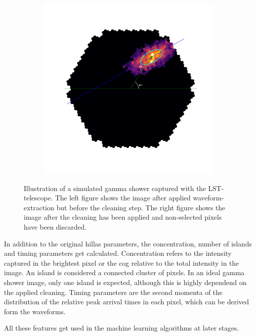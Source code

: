 \begin{figure}
\begin{subfigure}{0.3\textwidth}
        \label{fig:shower_image_cleaned}
    \end{subfigure}
    \begin{subfigure}{0.3\textwidth}
        \includegraphics[width=0.9\linewidth]{Plots/hillas_cleaned_params.pdf} 
        \label{fig:hillas_parameters_only}
    \end{subfigure}
    \caption{Illustration of a simulated gamma shower captured with the LST-telescope.
        The left figure shows the image after applied waveform-extraction but before
        the cleaning step. The right figure shows the image after the cleaning has been applied
        and non-selected pixels have been discarded.}
    \label{fig:shower_image}
\end{figure}

In addition to the original hillas parameters, the concentration, number of islands and timing parameters
get calculated.
Concentration refers to the intensity captured in the brightest pixel or the cog relative to 
the total intensity in the image.
An island is considered a connected cluster of pixels. In an ideal gamma shower image, only one island
is expected, although this is highly dependend on the applied cleaning.
Timing parameters are the second momenta of the distribution of the relative peak arrival times
in each pixel, which can be derived form the waveforms.

All these features get used in the machine learning algorithms at later stages.

